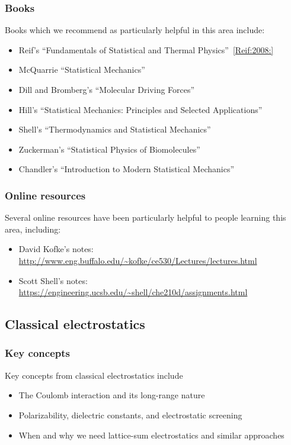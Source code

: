 \documentclass[9pt,bestpractices]{livecoms}
\begin{document}
\subsubsection{Books}

Books which we recommend as particularly helpful in this area include:
\begin{itemize}
\item Reif's ``Fundamentals of Statistical and Thermal Physics''~\ref{Reif:2008:}
\item McQuarrie ``Statistical Mechanics''~\cite{McQuarrie:2000:}
\item Dill and Bromberg's ``Molecular Driving Forces''~\cite{DillBook}
\item Hill's ``Statistical Mechanics: Principles and Selected Applications''~\cite{Hill:1987:}
\item Shell's ``Thermodynamics and Statistical Mechanics''~\cite{ShellBook}
\item Zuckerman's ``Statistical Physics of Biomolecules''~\cite{Zuckerman:2010:}
\item Chandler's ``Introduction to Modern Statistical Mechanics''~\cite{Chandler:1987:}
\end{itemize}

\subsubsection{Online resources}

Several online resources have been particularly helpful to people learning this area, including:
\begin{itemize}
\item David Kofke's notes: \url{http://www.eng.buffalo.edu/~kofke/ce530/Lectures/lectures.html}
\item Scott Shell's notes: \url{https://engineering.ucsb.edu/~shell/che210d/assignments.html}
\end{itemize}

\subsection{Classical electrostatics}
\label{sec:classical_electrostatics}
\subsubsection{Key concepts}
Key concepts from classical electrostatics include
\begin{itemize}
\item The Coulomb interaction and its long-range nature
\item Polarizability, dielectric constants, and electrostatic screening
\item When and why we need lattice-sum electrostatics and similar approaches
\end{itemize}
\end{document}
